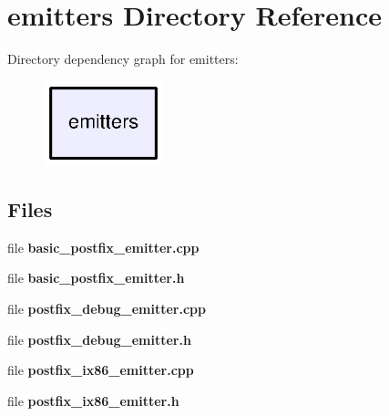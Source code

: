 \section{emitters Directory Reference}
\label{dir_a3acb7f3ef1f44c6d332373fbbeb1037}
Directory dependency graph for emitters\+:
\nopagebreak
\begin{figure}[H]
\begin{center}
\leavevmode
\includegraphics[width=98pt]{dir_a3acb7f3ef1f44c6d332373fbbeb1037_dep}
\end{center}
\end{figure}
\subsection*{Files}
\begin{DoxyCompactItemize}
\item 
file {\bfseries basic\+\_\+postfix\+\_\+emitter.\+cpp}
\item 
file {\bfseries basic\+\_\+postfix\+\_\+emitter.\+h}
\item 
file {\bfseries postfix\+\_\+debug\+\_\+emitter.\+cpp}
\item 
file {\bfseries postfix\+\_\+debug\+\_\+emitter.\+h}
\item 
file {\bfseries postfix\+\_\+ix86\+\_\+emitter.\+cpp}
\item 
file {\bfseries postfix\+\_\+ix86\+\_\+emitter.\+h}
\end{DoxyCompactItemize}
